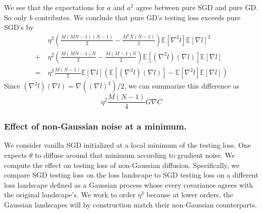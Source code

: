 \documentclass[anon,12pt]{colt2021} %
\newcommand{\wrap}[1]{\left(#1\right)}
\newcommand{\expct}[1]{\mathbb{E}\left[#1\right]}
\begin{document}
{\begin{shaded}
                We see that the expectations for $a$ and $a^2$ agree
                between pure SGD and pure GD.  So only $b$ contributes.  We
                conclude that pure GD's testing loss exceeds pure SGD's by
                \begin{align*}
                       ~&\eta^2
                        \wrap{\frac{M(MN-1)(N-1)}{2}  - \frac{M^2N(N-1)}{2}}
                        \expct{\nabla^2 l} \expct{\nabla l}^2 \\
                    +   ~&\eta^2 
                        \wrap{\frac{M(MN-1)N}{2} - \frac{M(M-1)N}{2}}
                        \expct{(\nabla^2 l) (\nabla l)} \expct{\nabla l} \\
                    = 
                        ~&\eta^2     \frac{M(N-1)}{2}
                    \expct{\nabla l} \wrap{
                          \expct{(\nabla^2 l) (\nabla l)}
                        - \expct{\nabla^2 l} \expct{\nabla l}
                    }
                \end{align*}
                Since $(\nabla^2 l) (\nabla l) = \nabla((\nabla l)^2)/2$, we can 
                summarize this difference as
                $$
                    \eta^2 \frac{M(N-1)}{4}
                    G \nabla C 
                $$
            \end{shaded}

        \subsubsection{Effect of non-Gaussian noise at a minimum.}
            We consider vanilla SGD initialized at a local minimum of the testing loss.
            One expects $\theta$ to diffuse around that minimum according to
            gradient noise.  We compute the effect on testing loss of non-Gaussian
            diffusion.  Specifically, we compare SGD testing loss on the loss
            landscape to SGD testing loss on a different loss landscape defined as a
            Gaussian process whose every covariance agrees with the original
            landscape's.  We work to order $\eta^3$ because at lower orders,
            the Gaussian landscapes will by construction match their non-Gaussian
            counterparts.

}
\end{document}
